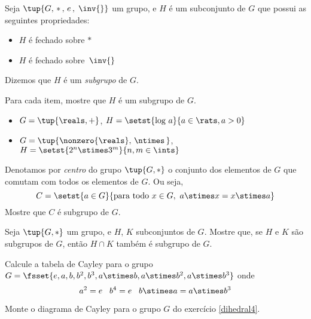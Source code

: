 \begin{definition}
	Seja $\tup{G, \, * \,, \, e \,, \;\inv{}}$ um grupo, e $H$ é um subconjunto de $G$ que possui as seguintes propriedades:
	\begin{itemize}
		\item $H$ é fechado sobre $*$
		\item $H$ é fechado sobre $\,\inv{}$
	\end{itemize}
	Dizemos que $H$ é um \emph{subgrupo} de $G$.
\end{definition}

\begin{exercise}
	Para cada item, mostre que $H$ é um subgrupo de $G$.
	\begin{itemize}
		\item $G = \tup{\reals, +}$, $H = \setst{\textrm{log}\ a}{a \in \rats, a > 0}$
		\item $G = \tup{\nonzero{\reals}, \, \ntimes \, }$, $H = \setst{2^n \stimes 3^m}{n, m \in \ints}$ 
	\end{itemize}
\end{exercise}

\begin{exercise}
	\label{centersub}
	Denotamos por \emph{centro} do grupo $\tup{G, *}$ o conjunto dos elementos de $G$ que comutam com todos os elementos de $G$. Ou seja,
		\[ C = \setst{a \in G}{\textrm{para todo}\ x \in G,\ a \stimes x = x \stimes a} \]
	Mostre que $C$ é subgrupo de $G$.
\end{exercise}

\begin{exercise}
	Seja $\tup{G, *}$ um grupo, e $H$, $K$ subconjuntos de $G$. Mostre que, se $H$ e $K$ são subgrupos de $G$, então $H \cap K$ também é subgrupo de $G$.
\end{exercise}

\begin{exercise}
	\label{dihedral4}
	Calcule a tabela de Cayley para o grupo $G = \fsset{e, a, b, b^2, b^3, a \stimes b, a \stimes b^2, a \stimes b^3}$ onde
		\[ a^2 = e \;\;\; b^4 = e \;\;\; b \stimes a = a \stimes b^3 \]
\end{exercise}

\begin{exercise}
	Monte o diagrama de Cayley para o grupo $G$ do exercício \ref{dihedral4}.
\end{exercise}